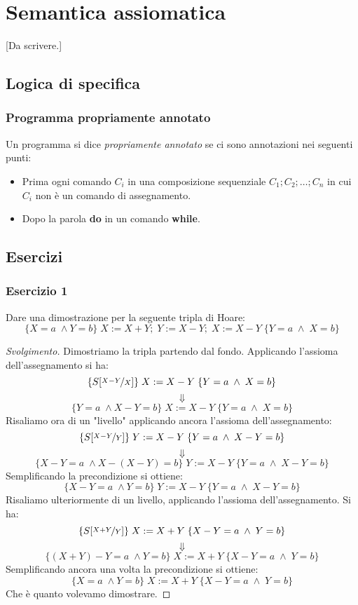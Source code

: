 \chapter{Semantica assiomatica}

[Da scrivere.]

\section{Logica di specifica}


\subsection{Programma propriamente annotato}
\begin{definizione}
Un programma si dice \emph{propriamente annotato} se ci sono annotazioni nei seguenti punti:
\begin{itemize}
	\item Prima ogni comando $C_i$ in una composizione sequenziale $C_1;C_2; \dots ;C_n$ in cui $C_i$ non è un comando di assegnamento.
	\item Dopo la parola \textbf{do} in un comando \textbf{while}.
\end{itemize}
\end{definizione}


\section{Esercizi}
\newcommand{\mactext}[1]{\text{\texttt{#1}}}

\subsection{Esercizio 1}
Dare una dimostrazione per la seguente tripla di Hoare:
$$ \{X=a \; \land Y=b\} \; X:=X+Y; \; Y:=X-Y; \; X:=X-Y \; \{Y=a \; \land \; X=b\} $$

\begin{proof}[Svolgimento]
Dimostriamo la tripla partendo dal fondo. Applicando l'assioma dell'assegnamento si ha:
$$ \{S[\nicefrac{X-Y}{X}] \} \; X:=X-Y \; \{Y=a \; \land \; X=b\} $$
$$ \Downarrow $$
$$ \{Y=a \; \land X-Y=b \} \; X:=X-Y \; \{Y=a \; \land \; X=b\} $$
Risaliamo ora di un "livello" applicando ancora l'assioma dell'assegnamento:
$$ \{S[\nicefrac{X-Y}{Y}] \} \; Y:=X-Y \; \{Y=a \; \land \; X-Y=b\} $$
$$ \Downarrow $$
$$ \{X-Y=a \; \land X-(X-Y)=b \} \; Y:=X-Y \; \{Y=a \; \land \; X-Y=b\} $$
Semplificando la precondizione si ottiene:
$$ \{X-Y=a \; \land Y=b \} \; Y:=X-Y \; \{Y=a \; \land \; X-Y=b\} $$
Risaliamo ulteriormente di un livello, applicando l'assioma dell'assegnamento. Si ha:
$$ \{S[\nicefrac{X+Y}{Y}] \} \; X:=X+Y \; \{X-Y=a \; \land \; Y=b\} $$
$$ \Downarrow $$
$$ \{(X+Y)-Y=a \; \land Y=b \} \; X:=X+Y \; \{X-Y=a \; \land \; Y=b\} $$
Semplificando ancora una volta la precondizione si ottiene:
$$ \{X=a \; \land Y=b \} \; X:=X+Y \; \{X-Y=a \; \land \; Y=b\} $$
Che è quanto volevamo dimostrare.
\end{proof}

